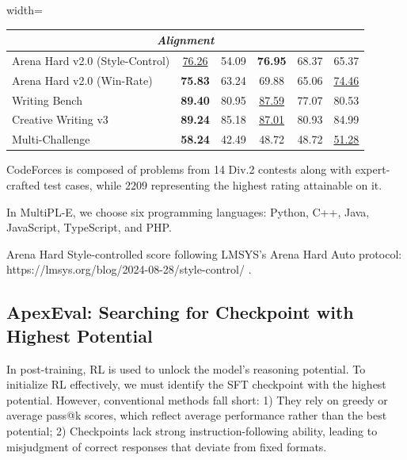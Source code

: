 \documentclass[table]{gtech}
\theoremstyle{definition}
\begin{document}
\begin{table}[t]
\begin{adjustbox}{width=\linewidth}
\begin{threeparttable}
\begin{tabular}{lccccc}
\midrule \multicolumn{6}{c}{\textit{Alignment}} \\
\midrule Arena Hard v2.0 (Style-Control)\tnote{3} & \underline{76.26} & 54.09 & \textbf{76.95} & 68.37 & 65.37 \\
 Arena Hard v2.0 (Win-Rate) & \textbf{75.83}  & 63.24 & 69.88 & 65.06 & \underline{74.46} \\
 Writing Bench & \textbf{89.40}  & 80.95 & \underline{87.59} & 77.07 & 80.53 \\
 Creative Writing v3 & \textbf{89.24} & 85.18 & \underline{87.01} & 80.93 & 84.99 \\
Multi-Challenge & \textbf{58.24} & 42.49 & 48.72 & 48.72 & \underline{51.28} \\
\hline
\end{tabular}
\begin{tablenotes}
        \footnotesize
        \item[1] CodeForces is composed of problems from 14 Div.2 contests along with expert-crafted test cases, while $2209$ representing the highest rating attainable on it.
        \item[2] In MultiPL-E, we choose six programming languages: Python, C++, Java, JavaScript, TypeScript, and PHP.
        \item[3] Arena Hard Style-controlled score following LMSYS’s Arena Hard Auto protocol: https://lmsys.org/blog/2024-08-28/style-control/ .
    \end{tablenotes}
\end{threeparttable}
\end{adjustbox}
\end{table}

\subsection{ApexEval: Searching for Checkpoint with Highest Potential}
\label{ApexEval}

In post-training, RL is used to unlock the model’s reasoning potential. To initialize RL effectively, we must identify the SFT checkpoint with the highest potential. However, conventional methods fall short: 1) They rely on greedy or average pass@k scores, which reflect average performance rather than the best potential; 2) Checkpoints lack strong instruction-following ability, leading to misjudgment of correct responses that deviate from fixed formats.
\end{document}
